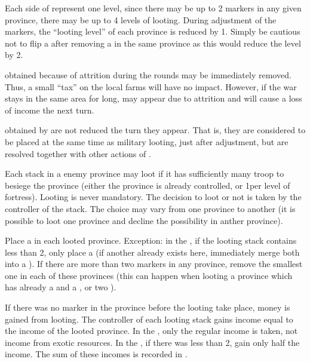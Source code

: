 \begin{designnote}
  Each side of \PILLAGE represent one level, since there may be up to 2
  markers in any given province, there may be up to 4 levels of
  looting. During adjustment of the markers, the ``looting level'' of each
  province is reduced by 1. Simply be cautious not to flip a \PILLAGE\Faceplus
  after removing a \PILLAGE\Facemoins in the same province as this would
  reduce the level by 2.

  \smallskip

  \PILLAGE obtained because of attrition during the rounds may be immediately
  removed. Thus, a small ``tax'' on the local farms will have no
  impact. However, if the war stays in the same area for long,
  \PILLAGE\Faceplus may appear due to attrition and will cause a loss of
  income the next turn.

  \smallskip

  \PILLAGE obtained by \corsaire are not reduced the turn they appear. That
  is, they are considered to be placed at the same time as military looting,
  just after adjustment, but are resolved together with other actions of
  \corsaire.
\end{designnote}

\aparag[Looting]
\bparag Each stack in a enemy province may loot if it has sufficiently many
troop to besiege the province (either the province is already controlled, or
1\LD per level of fortress).
\bparag Looting is never mandatory.
\bparag The decision to loot or not is taken by the controller of the
stack. The choice may vary from one province to another (it is possible to
loot one province and decline the possibility in anther province).

\bparag Place a \PILLAGE\Faceplus in each looted province.
\bparag Exception: in the \ROTW, if the looting stack contains less than 2\LD,
only place a \PILLAGE\Facemoins (if another already exists here, immediately
merge both into a \PILLAGE\Faceplus).
\bparag If there are more than two \PILLAGE markers in any province, remove
the smallest one in each of these provinces (this can happen when looting a
province which has already a \PILLAGE\Faceplus and a \PILLAGE\Facemoins, or
two \PILLAGE\Faceplus).

\bparag If there was no \PILLAGE marker in the province before the looting
take place, money is gained from looting.
\bparag The controller of each looting stack gains income equal to the income
of the looted province.
\bparag In the \ROTW, only the regular income is taken, not income from exotic
resources.
\bparag In the \ROTW, if there was less than 2\LD, gain only half the income.
\bparag The sum of these incomes is recorded in .

